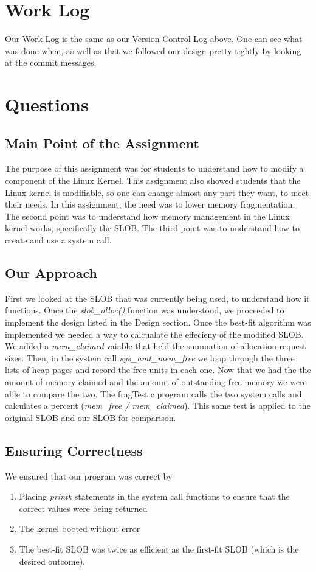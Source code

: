 \documentclass[draftclsnofoot, onecolumn, 10pt, compsoc]{IEEEtran}
\begin{document}
	\section{Work Log}
		Our Work Log is the same as our Version Control Log above.
		One can see what was done when, as well as that we followed our design pretty tightly by looking at the commit messages.
		
	\section{Questions}
		\subsection{Main Point of the Assignment}
			The purpose of this assignment was for students to understand how to modify a component of the Linux Kernel.
			This assignment also showed students that the Linux kernel is modifiable, so one can change almost any part they want, to meet their needs.
			In this assignment, the need was to lower memory fragmentation.
			The second point was to understand how memory management in the Linux kernel works, specifically the SLOB.
			The third point was to understand how to create and use a system call.
		\subsection{Our Approach}
			First we looked at the SLOB that was currently being used, to understand how it functions.
			Once the \textit{slob\_alloc()} function was understood, we proceeded to implement the design listed in the Design section.
			Once the best-fit algorithm was implemented we needed a way to calcualate the effecieny of the modified SLOB.
			We added a\textit{ mem\_claimed} vaiable that held the summation of allocation request sizes.
			Then, in the system call \textit{sys\_amt\_mem\_free} we loop through the three lists of heap pages and record the free units in each one.
			Now that we had the the amount of memory claimed and the amount of outstanding free memory we were able to compare the two.
			The fragTest.c program calls the two system calls and calculates a percent (\textit{mem\_free / mem\_claimed}).
			This same test is applied to the original SLOB and our SLOB for comparison.
		\subsection{Ensuring Correctness}
			We ensured that our program was correct by
			\begin{enumerate}
				\item Placing \textit{printk} statements in the system call functions to ensure that the correct values were being returned
				\item The kernel booted without error
				\item The best-fit SLOB was twice as efficient as the first-fit SLOB (which is the desired outcome).
			\end{enumerate}
		
\end{document}
